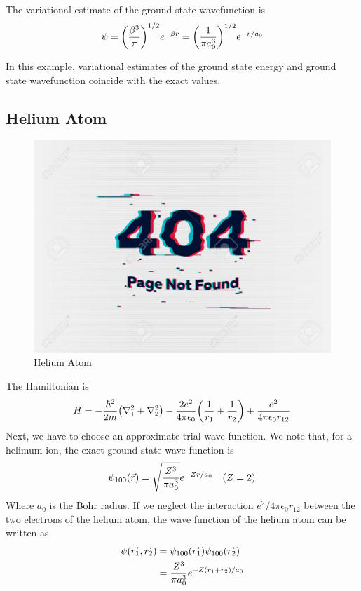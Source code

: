 		The variational estimate of the ground state wavefunction is
		\begin{align}
			\psi = \qty(\frac{\beta^3}{\pi})^{1/2} e^{-\beta r} = \qty(\frac{1}{\pi a_0^3})^{1/2} e^{-r/a_0}
		\end{align}
		
		In this example, variational estimates of the ground state energy and ground state wavefunction coincide with the exact values.
		
		
	
	\subsection{Helium Atom}
\begin{figure}
	\centering
	\includegraphics[width=0.5\linewidth]{Pictures/not-found.jpg}
	\caption{Helium Atom}
\end{figure}
	The Hamiltonian is
	\begin{equation}
		H = - \frac{\hbar^2}{2 m} \qty(\nabla_1^2 + \nabla_2^2) - \frac{2 e^2}{4 \pi \epsilon_0} \qty(\frac{1}{r_1} + \frac{1}{r_2})  +  \frac{e^2}{4 \pi \epsilon_0 r_{1 2}}
		\label{chapter21.eqn1-example-helium}
	\end{equation}
	Next, we have to choose an approximate trial wave function. We note that, for a helimum ion, the exact ground state wave function is
	\begin{align}
		\psi_{1 0 0}\qty(\vec{r}) = \sqrt{\frac{Z^3}{\pi a_0^3}} e^{-Z r / a_0} \quad (Z=2)
	\end{align}
	Where $a_0$ is the Bohr radius. If we neglect the interaction $e^2 / 4\pi \epsilon_0 r_{1 2}$ between the two electrons of the helium atom, the wave function of the helium atom can be written as
	\begin{align*}
		\psi\qty(\vec{r_1}, \vec{r_2}) 
		&= \psi_{1 0 0}\qty(\vec{r_1}) \psi_{1 0 0}\qty(\vec{r_2}) \\
		&= \frac{Z^3}{\pi a_0^3} e^{-Z \qty(r_1 + r_2)/a_0}
	\end{align*}
	
